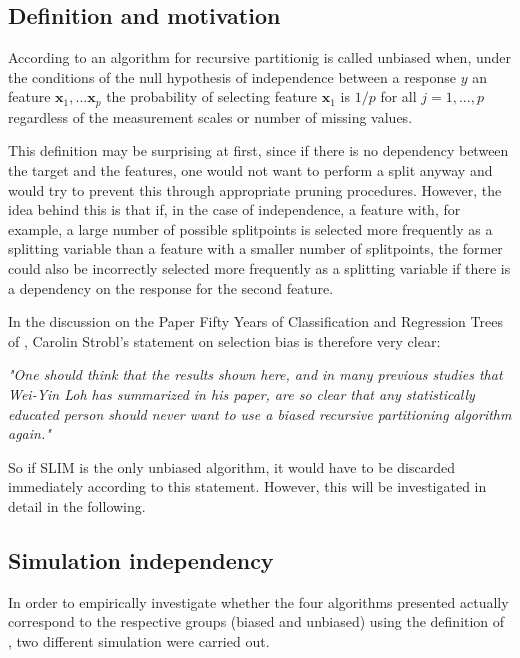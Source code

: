\subsection{Definition and motivation}

According to \citep{Hothorn.2006} an algorithm for recursive partitionig is called unbiased when, under the conditions of the null hypothesis of independence between a response $y$ an feature $\textbf{x}_{1},...\textbf{x}_{p}$ the probability of selecting feature $\textbf{x}_{1}$ is $1/p$ for all $j = 1,...,p$ regardless of the measurement scales or number of missing values. 

This definition may be surprising at first, since if there is no dependency between the target and the features, one would not want to perform a split anyway and would try to prevent this through appropriate pruning procedures.
However, the idea behind this is that if, in the case of independence, a feature with, for example, a large number of possible splitpoints is selected more frequently as a splitting variable than a feature with a smaller number of splitpoints, the former could also be incorrectly selected more frequently as a splitting variable if there is a dependency on the response for the second feature.
\citep{Loh.2014}


In the discussion on the Paper Fifty Years of Classification and Regression Trees of \citep{Loh.2014}, Carolin Strobl's statement on selection bias is therefore very clear:


{\par\centering \textit{"One should think that the results shown here, and in many previous studies that Wei-Yin Loh has summarized in his paper, are so clear that any statistically educated person should never
want to use a biased recursive partitioning algorithm again."}\par}

So if SLIM is the only unbiased algorithm, it would have to be discarded immediately according to this statement. However, this will be investigated in detail in the following.



\subsection{Simulation independency}
In order to empirically investigate whether the four algorithms presented actually correspond to the respective groups (biased and unbiased) using the definition of \citep{Hothorn.2006}, two different simulation were carried out.

